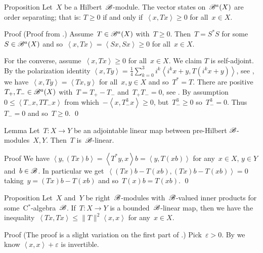 \documentclass[b]{subfiles}
\begin{document}
\begin{parsec}%
\begin{point}{Proposition}%
Let~$X$ be a Hilbert~$\mathscr{B}$-module.
The vector states on~$\mathscr{B}^a(X)$ are order separating;
that is: $T \geq 0$ if and only if~$\left<x,Tx\right> \geq 0$
for all~$x \in X$.
\begin{point}{Proof}%
(Proof from \cite[Lemma 4.1]{lance}.)
Assume~$T \in \mathscr{B}^a(X)$ with~$T \geq 0$.
Then~$T = S^*S$ for some~$S \in \mathscr{B}^a(X)$
    and so~$\left<x, Tx\right> = \left<Sx,Sx\right> \geq 0$
    for all~$x \in X$.

For the converse, assume~$\left<x, Tx\right> \geq 0$
    for all~$x \in X$.
We claim $T$ is self-adjoint.
By the polarization identity
$\left<x, Ty\right>
    = \frac{1}{4} \sum^3_{k=0} i^k \left< i^k x+y, T(i^k x+y)\right>$,
    see ,
    we have~$\left<x,Ty \right> = \left<Tx, y\right>$ for all~$x,y \in X$
    and so~$T^*=T$.
There are positive~$T_+,T_- \in \mathscr{B}^a(X)$
with~$T = T_+ - T_-$ and~$T_+T_- = 0$, see .
By assumption~$0 \leq \left<T_-x,TT_-x\right>$
    from which~$-\left<x,T_-^3x\right> \geq 0$,
    but~$T_-^3 \geq 0$ so~$T_-^3 = 0$.
    Thus~$T_- = 0$ and so~$T \geq 0$. \qed
\end{point}
\end{point}
\begin{point}{Lemma}%
Let~$T\colon X \to Y$
    be an adjointable linear map between pre-Hilbert $\mathscr{B}$-modules~$X,Y$.
Then~$T$ is~$\mathscr{B}$-linear.
\begin{point}{Proof}%
We have
    $\left<y, (Tx)b\right>
    =\left<T^*y, x\right>b
    =\left<y, T(xb)\right>$
for any~$x \in X$, $y \in Y$ and~$b \in \mathscr{B}$.
In particular we
get~$\left<(Tx)b-T(xb), (Tx)b-T(xb)\right>=0$
taking~$y = (Tx)b-T(xb)$
    and so~$T(x)b=T(xb)$. \qed
\end{point}
\end{point}
\begin{point}{Proposition}%
Let~$X$ and~$Y$ be right~$\mathscr{B}$-modules with~$\mathscr{B}$-valued
    inner products for some~C$^*$-algebra~$\mathscr{B}$.
If~$T \colon X \to Y$ is a bounded~$\mathscr{B}$-linear map,
    then we have the
        inequality~$\left<Tx,Tx\right>\leq \|T\|^2 \left<x,x\right>$
    for any~$x \in X$.
\begin{point}{Proof}
(The proof is a slight variation on the first part
of \cite[Thm.~2.8]{paschke}.)
Pick~$\varepsilon > 0$.
By 
    we know $\left<x,x\right> + \varepsilon$ is invertible.

\end{point}
\end{point}
\end{parsec}
\end{document}
